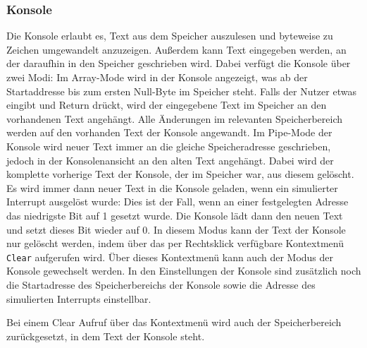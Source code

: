 \subsubsection{Konsole}
Die Konsole erlaubt es, Text aus dem Speicher auszulesen und byteweise zu
Zeichen umgewandelt anzuzeigen. Außerdem kann Text eingegeben werden, an der
daraufhin in den Speicher geschrieben wird. Dabei verfügt die Konsole über zwei
Modi: Im Array-Mode wird in der Konsole angezeigt, was ab der Startaddresse bis
zum ersten Null-Byte im Speicher steht. Falls der Nutzer etwas eingibt und
Return drückt, wird der eingegebene Text im Speicher an den vorhandenen Text
angehängt. Alle Änderungen im relevanten Speicherbereich werden auf den
vorhanden Text der Konsole angewandt. Im Pipe-Mode der Konsole wird neuer Text
immer an die gleiche Speicheradresse geschrieben, jedoch in der Konsolenansicht
an den alten Text angehängt. Dabei wird der komplette vorherige Text der
Konsole, der im Speicher war, aus diesem gelöscht. Es wird immer dann neuer Text
in die Konsole geladen, wenn ein simulierter Interrupt ausgelöst wurde: Dies ist
der Fall, wenn an einer festgelegten Adresse das niedrigste Bit auf 1 gesetzt
wurde. Die Konsole lädt dann den neuen Text und setzt dieses Bit wieder auf 0.
In diesem Modus kann der Text der Konsole nur gelöscht werden, indem über das
per Rechtsklick verfügbare Kontextmenü \texttt{Clear} aufgerufen wird. Über
dieses Kontextmenü kann auch der Modus der Konsole gewechselt werden. In den
Einstellungen der Konsole sind zusätzlich noch die Startadresse des
Speicherbereichs der Konsole sowie die Adresse des simulierten Interrupts
einstellbar.
\begin{warningblock}
Bei einem Clear Aufruf über das Kontextmenü wird auch der Speicherbereich
zurückgesetzt, in dem Text der Konsole steht.
\end{warningblock}

